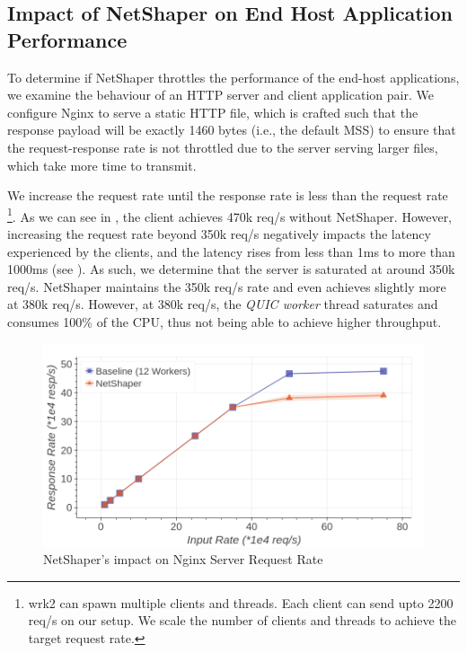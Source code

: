 \subsection{Impact of NetShaper on End Host Application Performance}
\label{subsec:netshaper-evaluation-http-reqs}

To determine if NetShaper throttles the performance of the end-host applications, we examine the behaviour of an HTTP server and client application pair.
We configure Nginx to serve a static HTTP file, which is crafted such that the response payload will be exactly 1460 bytes (i.e., the default MSS) to ensure that the request-response rate is not throttled due to the server serving larger files, which take more time to transmit.

We increase the request rate until the response rate is less than the request rate~
\footnote{wrk2 can spawn multiple clients and threads. Each client can send upto 2200 req/s on our setup. We scale the number of clients and threads to achieve the target request rate.}.
As we can see in , the client achieves 470k req/s without NetShaper.
However, increasing the request rate beyond 350k req/s negatively impacts the latency experienced by the clients, and the latency rises from less than 1ms to more than 1000ms (see ).
As such, we determine that the server is saturated at around 350k req/s.
NetShaper maintains the 350k req/s rate and even achieves slightly more at 380k req/s.
However, at 380k req/s, the \textit{QUIC worker} thread saturates and consumes 100\% of the CPU, thus not being able to achieve higher throughput.


\begin{figure}[!htb]
    \centering
    \includegraphics[width=\columnwidth]{figures/netshaper/evaluation/http_reqs.png}
    \caption{NetShaper's impact on Nginx Server Request Rate}
    \label{fig:netshaper-eval-http-reqs}
\end{figure}

